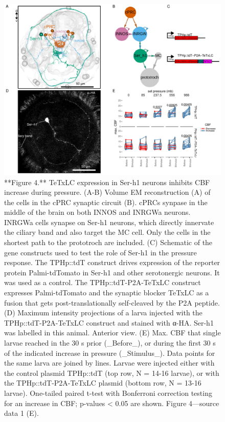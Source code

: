 \documentclass[
]{article}
\begin{document}
\begin{figure}
\includegraphics[width=38.89in]{Figures/Figure4} \caption{**Figure 4.** TeTxLC expression in Ser-h1 neurons inhibits CBF increase during pressure. (A-B) Volume EM reconstruction (A) of the cells in the cPRC synaptic circuit (B). cPRCs synpase in the middle of the brain on both INNOS and INRGWa neurons. INRGWa cells synapse on Ser-h1 neurons, which directly innervate the ciliary band and also target the MC cell. Only the cells in the shortest path to the prototroch are included.  (C) Schematic of the gene constructs used to test the role of Ser-h1 in the pressure response. The TPHp::tdT construct drives expression of the reporter protein Palmi-tdTomato in Ser-h1 and other serotonergic neurons. It was used as a control. The TPHp::tdT-P2A-TeTxLC construct expresses Palmi-tdTomato and the synaptic blocker TeTxLC as a fusion that gets post-translationally self-cleaved by the P2A peptide. (D) Maximum intensity projections of a larva injected with the TPHp::tdT-P2A-TeTxLC construct and stained with α-HA. Ser-h1 was labelled in this animal. Anterior view. (E) Max. CBF that single larvae reached in the 30 s prior (_Before_), or during the first 30 s of the indicated increase in pressure (_Stimulus_). Data points for the same larva are joined by lines. Larvae were injected either with the control plasmid TPHp::tdT (top row, N = 14-16 larvae), or with the TPHp::tdT-P2A-TeTxLC plasmid (bottom row, N = 13-16 larvae). One-tailed paired t-test with Bonferroni correction testing for an increase in CBF; p-values < 0.05 are shown. Figure 4---source data 1 (E).}\label{fig:unnamed-chunk-5}
\end{figure}
\end{document}
